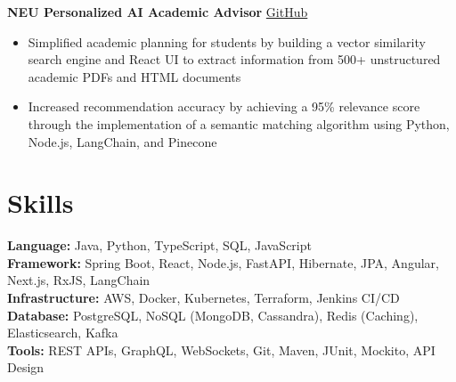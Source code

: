 \documentclass[11pt]{article}       %
\begin{document}
\textbf{NEU Personalized AI Academic Advisor} \hfill \href{https://github.com/darshan-aswathappa/web-dev-6150-final}{GitHub} \\
\vspace{-9pt}
\begin{itemize}
  \item Simplified academic planning for students by building a vector similarity search engine and React UI to extract information from 500+ unstructured academic PDFs and HTML documents
  \item Increased recommendation accuracy by achieving a 95\% relevance score through the implementation of a semantic matching algorithm using Python, Node.js, LangChain, and Pinecone
\end{itemize}

\vspace{-6pt}

\section*{Skills}
\textbf{Language:} Java, Python, TypeScript, SQL, JavaScript \\
\textbf{Framework:} Spring Boot, React, Node.js, FastAPI, Hibernate, JPA, Angular, Next.js, RxJS, LangChain \\
\textbf{Infrastructure:} AWS, Docker, Kubernetes, Terraform, Jenkins CI/CD \\
\textbf{Database:} PostgreSQL, NoSQL (MongoDB, Cassandra), Redis (Caching), Elasticsearch, Kafka \\
\textbf{Tools:} REST APIs, GraphQL, WebSockets, Git, Maven, JUnit, Mockito, API Design
\end{document}
